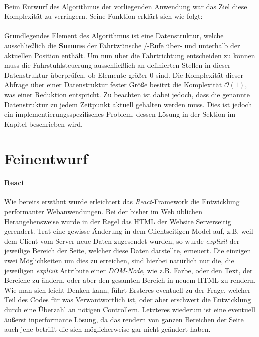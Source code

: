 \paragraph{}
Beim Entwurf des Algorithmus der vorliegenden Anwendung war das Ziel diese Komplexität zu verringern.
Seine Funktion erklärt sich wie folgt:\\ \\ Grundlegendes Element des Algorithmus ist eine Datenstruktur, welche ausschließlich die \textbf{Summe} der Fahrtwünsche /-Rufe über- und unterhalb der aktuellen Position enthält.
Um nun über die Fahrtrichtung entscheiden zu können muss die Fahrstuhlsteuerung ausschließlich an definierten Stellen in dieser Datenstruktur überprüfen, ob Elemente größer 0 sind.
Die Komplexität dieser Abfrage über einer Datenstruktur fester Größe besitzt die Komplexität $\mathcal{O}(1)$, was einer Reduktion entspricht.
Zu beachten ist dabei jedoch, dass die genannte Datenstruktur zu jedem Zeitpunkt aktuell gehalten werden muss. Dies ist jedoch ein implementierungsspezifisches Problem, dessen Lösung in der Sektion \textit{} im Kapitel \textbf{} beschrieben wird.

\section{Feinentwurf}

\paragraph{React}
Wie bereits erwähnt wurde erleichtert das \textit{React}-Framework die Entwicklung performanter Webanwendungen.
Bei der bisher im Web üblichen Herangehensweise wurde in der Regel das HTML der Website Serverseitig gerendert.
Trat eine gewisse Änderung in dem Clientseitigen Model auf, z.B. weil dem Client vom Server neue Daten zugesendet wurden, so wurde \textit{explizit} der jeweilige Bereich der Seite, welcher diese Daten darstellte, erneuert.
Die einzigen zwei Möglichkeiten um dies zu erreichen, sind hierbei natürlich nur die, die jeweiligen \textit{explizit} Attribute einer \textit{DOM-Node}, wie z.B. Farbe, oder den Text, der Bereiche zu ändern, oder aber den gesamten Bereich in neuem HTML zu rendern.
Wie man sich leicht Denken kann, führt Ersteres eventuell zu der Frage, welcher Teil des Codes für was Verwantwortlich ist, oder aber erschwert die Entwicklung durch eine Überzahl an nötigen Controllern.
Letzteres wiederum ist eine eventuell äußerst inperformante Lösung, da das rendern von ganzen Bereichen der Seite auch jene betrifft die sich möglicherweise gar nicht geändert haben.


